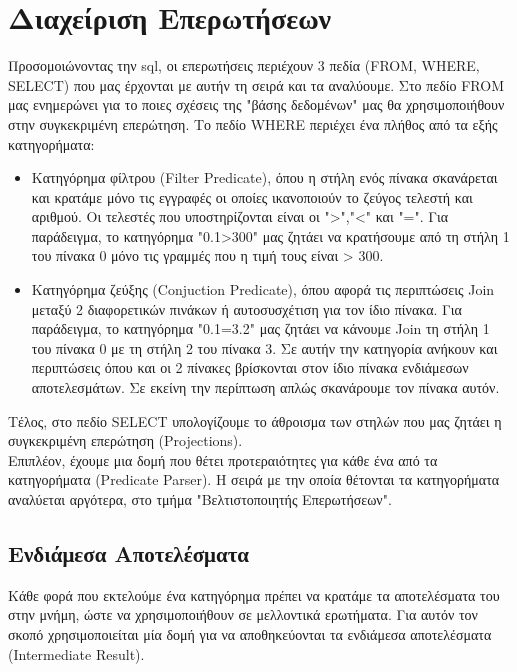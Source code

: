 \documentclass[12pt, a4paper]{article}
\begin{document}
\section{Διαχείριση Επερωτήσεων}

Προσομοιώνοντας την sql, οι επερωτήσεις περιέχουν 3 πεδία (FROM, WHERE, SELECT) που μας έρχονται με αυτήν τη σειρά και τα αναλύουμε. Στο πεδίο FROM μας ενημερώνει για το ποιες σχέσεις της "βάσης δεδομένων" μας θα χρησιμοποιήθουν στην συγκεκριμένη επερώτηση. Το πεδίο WHERE περιέχει ένα πλήθος από τα εξής κατηγορήματα:

\begin{itemize}
\item Κατηγόρημα φίλτρου (Filter Predicate), όπου η στήλη ενός πίνακα σκανάρεται και κρατάμε μόνο τις εγγραφές οι οποίες ικανοποιούν το ζεύγος τελεστή και αριθμού. Οι τελεστές που υποστηρίζονται είναι οι ">","<" και "=". Για παράδειγμα, το κατηγόρημα "0.1>300" μας ζητάει να κρατήσουμε από τη στήλη 1 του πίνακα 0 μόνο τις γραμμές που η τιμή τους είναι > 300. 
\item Κατηγόρημα ζεύξης (Conjuction Predicate), όπου αφορά τις περιπτώσεις Join μεταξύ 2 διαφορετικών πινάκων ή αυτοσυσχέτιση για τον ίδιο πίνακα. Για παράδειγμα, το κατηγόρημα "0.1=3.2" μας ζητάει να κάνουμε Join τη στήλη 1 του πίνακα 0 με τη στήλη 2 του πίνακα 3. Σε αυτήν την κατηγορία ανήκουν και περιπτώσεις όπου και οι 2 πίνακες βρίσκονται στον ίδιο πίνακα ενδιάμεσων αποτελεσμάτων. Σε εκείνη την περίπτωση απλώς σκανάρουμε τον πίνακα αυτόν.
\end{itemize}

Τέλος, στο πεδίο SELECT υπολογίζουμε το άθροισμα των στηλών που μας ζητάει η συγκεκριμένη επερώτηση (Projections).\\

Επιπλέον, έχουμε μια δομή που θέτει προτεραιότητες για κάθε ένα από τα κατηγορήματα (Predicate Parser). Η σειρά με την οποία θέτονται τα κατηγορήματα αναλύεται αργότερα, στο τμήμα "Βελτιστοποιητής Επερωτήσεων".

\subsection{Ενδιάμεσα Αποτελέσματα}

Κάθε φορά που εκτελούμε ένα κατηγόρημα πρέπει να κρατάμε τα αποτελέσματα του στην μνήμη, ώστε να χρησιμοποιήθουν σε μελλοντικά ερωτήματα. Για αυτόν τον σκοπό χρησιμοποιείται μία δομή για να αποθηκεύονται τα ενδιάμεσα αποτελέσματα (Intermediate Result).\\
\end{document}

